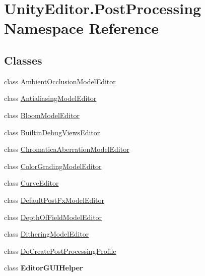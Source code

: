 \hypertarget{namespace_unity_editor_1_1_post_processing}{}\section{Unity\+Editor.\+Post\+Processing Namespace Reference}
\label{namespace_unity_editor_1_1_post_processing}
\subsection*{Classes}
\begin{DoxyCompactItemize}
\item 
class \hyperlink{class_unity_editor_1_1_post_processing_1_1_ambient_occlusion_model_editor}{Ambient\+Occlusion\+Model\+Editor}
\item 
class \hyperlink{class_unity_editor_1_1_post_processing_1_1_antialiasing_model_editor}{Antialiasing\+Model\+Editor}
\item 
class \hyperlink{class_unity_editor_1_1_post_processing_1_1_bloom_model_editor}{Bloom\+Model\+Editor}
\item 
class \hyperlink{class_unity_editor_1_1_post_processing_1_1_builtin_debug_views_editor}{Builtin\+Debug\+Views\+Editor}
\item 
class \hyperlink{class_unity_editor_1_1_post_processing_1_1_chromatica_aberration_model_editor}{Chromatica\+Aberration\+Model\+Editor}
\item 
class \hyperlink{class_unity_editor_1_1_post_processing_1_1_color_grading_model_editor}{Color\+Grading\+Model\+Editor}
\item 
class \hyperlink{class_unity_editor_1_1_post_processing_1_1_curve_editor}{Curve\+Editor}
\item 
class \hyperlink{class_unity_editor_1_1_post_processing_1_1_default_post_fx_model_editor}{Default\+Post\+Fx\+Model\+Editor}
\item 
class \hyperlink{class_unity_editor_1_1_post_processing_1_1_depth_of_field_model_editor}{Depth\+Of\+Field\+Model\+Editor}
\item 
class \hyperlink{class_unity_editor_1_1_post_processing_1_1_dithering_model_editor}{Dithering\+Model\+Editor}
\item 
class \hyperlink{class_unity_editor_1_1_post_processing_1_1_do_create_post_processing_profile}{Do\+Create\+Post\+Processing\+Profile}
\item 
class {\bfseries Editor\+G\+U\+I\+Helper}
\item 

\end{DoxyCompactItemize}
